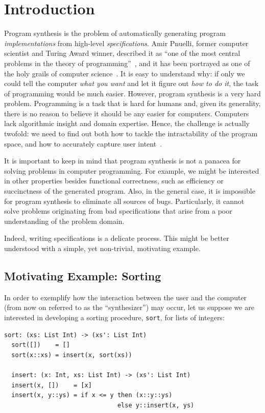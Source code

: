 \chapter{Introduction}
\label{chapter:introduction}

Program synthesis is the problem of automatically generating program
\textit{implementations} from high-level \textit{specifications}.
Amir Pnuelli, former computer scientist and Turing Award winner, described it as
``one of the most central problems in the theory of
programming''~\cite{Pnueli:1989:ARM}, and it has been portrayed as one of the
holy grails of computer science~\cite{Solar-Lezama:2008,Gulwani2017}.
It is easy to understand why: if only we could tell the computer \textit{what you
want} and let it figure out \textit{how to do it}, the task of programming would
be much easier.
However, program synthesis is a very hard problem.
Programming is a task that is hard for humans and, given its generality,
there is no reason to believe it should be any easier for computers.
Computers lack algorithmic insight and domain expertise.
Hence, the challenge is actually twofold: we need to find out both how to
tackle the intractability of the program space, and how to accurately capture
user intent~\cite{Gulwani2017}.

It is important to keep in mind that program synthesis is not a panacea for
solving problems in computer programming.
For example, we might be interested in other properties besides functional
correctness, such as efficiency or succinctness of the generated program.
Also, in the general case, it is impossible for program synthesis to eliminate
all sources of bugs.
Particularly, it cannot solve problems originating from bad specifications
that arise from a poor understanding of the problem domain.

Indeed, writing specifications is a delicate process.
This might be better understood with a simple, yet non-trivial, motivating
example.

\section{Motivating Example: Sorting}
\label{sec:sorting-example}

In order to exemplify how the interaction between the user and the computer
(from now on referred to as the ``synthesizer'') may occur, let us suppose we
are interested in developing a sorting procedure, \lstinline{sort}, for lists of
integers:

\begin{lstlisting}[xleftmargin=.2\textwidth]
  sort: (xs: List Int) -> (xs': List Int)
  sort([])    = []
  sort(x::xs) = insert(x, sort(xs))

  insert: (x: Int, xs: List Int) -> (xs': List Int)
  insert(x, [])    = [x]
  insert(x, y::ys) = if x <= y then (x::y::ys)
                               else y::insert(x, ys)
\end{lstlisting}

